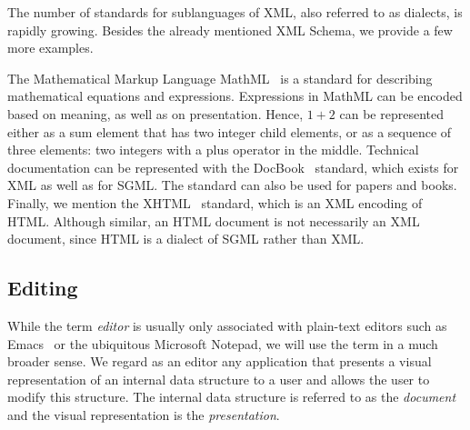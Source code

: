 
The number of standards for sublanguages of XML, also referred to as dialects, is rapidly growing. Besides the already mentioned XML Schema, we provide a few more examples.

The Mathematical Markup Language MathML~\cite{mathml20} is a standard for describing mathematical equations and expressions.  \bc Expressions in MathML can be encoded based on  meaning, as well as on presentation. Hence, $1+2$ can be represented either as a sum  element that has two integer child elements, or as a sequence of three elements: two integers with a plus operator in the middle.  \ec Technical documentation can be represented with the DocBook~\cite{walsh02docbook} standard, which exists for XML as well as for SGML. The standard can also be used for papers and books. Finally, we mention the XHTML~\cite{xhtml11} standard, which is an XML encoding of HTML. Although similar, an HTML document is not necessarily an XML document, since HTML is a dialect of SGML rather than XML.





\subsection{Editing}
\label{sect:editing}


While the term {\em editor} is usually only associated with plain-text editors such as Emacs~\cite{stallman81emacs} or the ubiquitous Microsoft Notepad, we will use the term in a much broader sense. We regard as an editor any application that presents a visual representation of an internal data structure to a user and allows the user to modify this structure. The internal data structure is referred to as the {\em document} and the visual representation is the {\em presentation}. 

